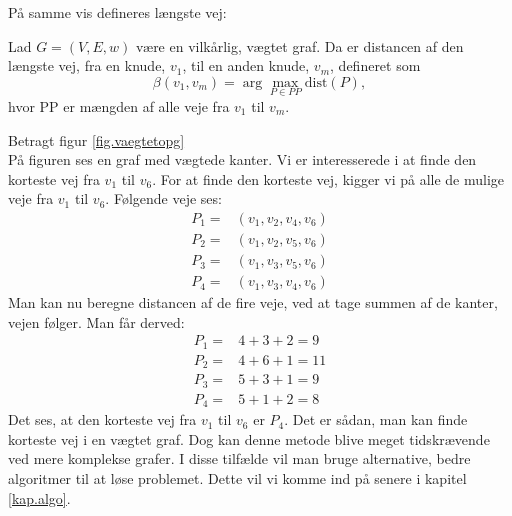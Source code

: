 På samme vis defineres længste vej:

\begin{defn} 
	Lad $G=(V,E,w)$ være en vilkårlig, vægtet graf. Da er distancen af den længste vej, fra en knude, $v_1$, til en anden knude, $v_m$, defineret som
	\begin{equation*}
		\beta(v_1,v_m)=\arg \max_{P \in PP}
		\textrm{dist}(P),
	\end{equation*}
	hvor PP er mængden af alle veje fra $v_1$ til $v_m$.
\end{defn}

\begin{exmp}
Betragt figur \ref{fig.vaegtetopg} \\

På figuren ses en graf med vægtede kanter. Vi er interesserede i at finde den korteste vej fra $v_1$ til $v_6$. For at finde den korteste vej, kigger vi på alle de mulige veje fra $v_1$ til $v_6$.
Følgende veje ses:
\begin{align*}
	P_1=&(v_1,v_2,v_4,v_6)\\
	P_2=&(v_1,v_2,v_5,v_6)\\
	P_3=&(v_1,v_3,v_5,v_6)\\
	P_4=&(v_1,v_3,v_4,v_6)
\end{align*}
Man kan nu beregne distancen af de fire veje, ved at tage summen af de kanter, vejen følger. Man får derved:
\begin{align*}
	P_1=&4+3+2=9\\
	P_2=&4+6+1=11\\
	P_3=&5+3+1=9\\
	P_4=&5+1+2=8
\end{align*}
Det ses, at den korteste vej fra $v_1$ til $v_6$ er $P_4$. 
Det er sådan, man kan finde korteste vej i en vægtet graf. Dog kan denne metode blive meget tidskrævende ved mere komplekse grafer. I disse tilfælde vil man bruge alternative, bedre algoritmer til at løse problemet. Dette vil vi komme ind på senere i kapitel \ref{kap.algo}.
\end{exmp}
